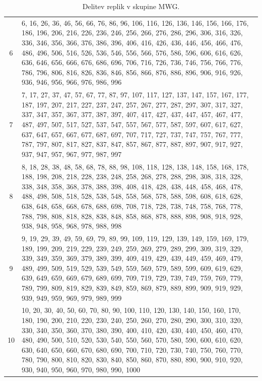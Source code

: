 \documentclass[a4paper, 12pt]{book}
\begin{document}
\begin{table}
\begin{center}
\begin{tabulary}{1.0\textwidth}{C p{11.80cm}}
      6 & 6, 16, 26, 36, 46, 56, 66, 76, 86, 96, 106, 116, 126, 136, 146, 156, 166, 176, 186, 196, 206, 216, 226, 236, 246, 256, 266, 276, 286, 296, 306, 316, 326, 336, 346, 356, 366, 376, 386, 396, 406, 416, 426, 436, 446, 456, 466, 476, 486, 496, 506, 516, 526, 536, 546, 556, 566, 576, 586, 596, 606, 616, 626, 636, 646, 656, 666, 676, 686, 696, 706, 716, 726, 736, 746, 756, 766, 776, 786, 796, 806, 816, 826, 836, 846, 856, 866, 876, 886, 896, 906, 916, 926, 936, 946, 956, 966, 976, 986, 996 \\
      7 & 7, 17, 27, 37, 47, 57, 67, 77, 87, 97, 107, 117, 127, 137, 147, 157, 167, 177, 187, 197, 207, 217, 227, 237, 247, 257, 267, 277, 287, 297, 307, 317, 327, 337, 347, 357, 367, 377, 387, 397, 407, 417, 427, 437, 447, 457, 467, 477, 487, 497, 507, 517, 527, 537, 547, 557, 567, 577, 587, 597, 607, 617, 627, 637, 647, 657, 667, 677, 687, 697, 707, 717, 727, 737, 747, 757, 767, 777, 787, 797, 807, 817, 827, 837, 847, 857, 867, 877, 887, 897, 907, 917, 927, 937, 947, 957, 967, 977, 987, 997 \\
      8 & 8, 18, 28, 38, 48, 58, 68, 78, 88, 98, 108, 118, 128, 138, 148, 158, 168, 178, 188, 198, 208, 218, 228, 238, 248, 258, 268, 278, 288, 298, 308, 318, 328, 338, 348, 358, 368, 378, 388, 398, 408, 418, 428, 438, 448, 458, 468, 478, 488, 498, 508, 518, 528, 538, 548, 558, 568, 578, 588, 598, 608, 618, 628, 638, 648, 658, 668, 678, 688, 698, 708, 718, 728, 738, 748, 758, 768, 778, 788, 798, 808, 818, 828, 838, 848, 858, 868, 878, 888, 898, 908, 918, 928, 938, 948, 958, 968, 978, 988, 998 \\
      9 & 9, 19, 29, 39, 49, 59, 69, 79, 89, 99, 109, 119, 129, 139, 149, 159, 169, 179, 189, 199, 209, 219, 229, 239, 249, 259, 269, 279, 289, 299, 309, 319, 329, 339, 349, 359, 369, 379, 389, 399, 409, 419, 429, 439, 449, 459, 469, 479, 489, 499, 509, 519, 529, 539, 549, 559, 569, 579, 589, 599, 609, 619, 629, 639, 649, 659, 669, 679, 689, 699, 709, 719, 729, 739, 749, 759, 769, 779, 789, 799, 809, 819, 829, 839, 849, 859, 869, 879, 889, 899, 909, 919, 929, 939, 949, 959, 969, 979, 989, 999 \\
      10 & 10, 20, 30, 40, 50, 60, 70, 80, 90, 100, 110, 120, 130, 140, 150, 160, 170, 180, 190, 200, 210, 220, 230, 240, 250, 260, 270, 280, 290, 300, 310, 320, 330, 340, 350, 360, 370, 380, 390, 400, 410, 420, 430, 440, 450, 460, 470, 480, 490, 500, 510, 520, 530, 540, 550, 560, 570, 580, 590, 600, 610, 620, 630, 640, 650, 660, 670, 680, 690, 700, 710, 720, 730, 740, 750, 760, 770, 780, 790, 800, 810, 820, 830, 840, 850, 860, 870, 880, 890, 900, 910, 920, 930, 940, 950, 960, 970, 980, 990, 1000 \\
    \end{tabulary}
  \end{center}

  \caption{Delitev replik v skupine MWG.}
  \label{tbl:sim_MWG_contents}
\end{table}
\end{document}
